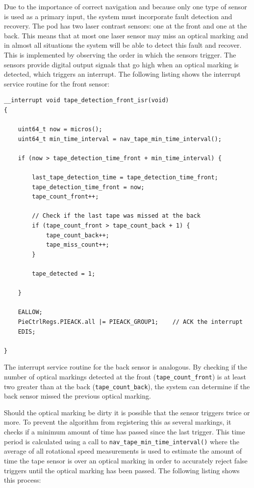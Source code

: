 Due to the importance of correct navigation and because only one type of sensor is used as a primary input, the system must incorporate fault detection and recovery. The pod has two laser contrast sensors: one at the front and one at the back. This means that at most one laser sensor may miss an optical marking and in almost all situations the system will be able to detect this fault and recover. This is implemented by observing the order in which the sensors trigger. The sensors provide digital output signals that go high when an optical marking is detected, which triggers an interrupt. The following listing shows the interrupt service routine for the front sensor:

\begin{verbatim}
__interrupt void tape_detection_front_isr(void)
{

    uint64_t now = micros();
    uint64_t min_time_interval = nav_tape_min_time_interval();

    if (now > tape_detection_time_front + min_time_interval) {

        last_tape_detection_time = tape_detection_time_front;
        tape_detection_time_front = now;
        tape_count_front++;

        // Check if the last tape was missed at the back
        if (tape_count_front > tape_count_back + 1) {
            tape_count_back++;
            tape_miss_count++;
        }

        tape_detected = 1;

    }

    EALLOW;
    PieCtrlRegs.PIEACK.all |= PIEACK_GROUP1;    // ACK the interrupt
    EDIS;

}
\end{verbatim}

The interrupt service routine for the back sensor is analogous. By checking if the number of optical markings detected at the front (\texttt{tape_count_front}) is at least two greater than at the back (\texttt{tape_count_back}), the system can determine if the back sensor missed the previous optical marking.

Should the optical marking be dirty it is possible that the sensor triggers twice or more. To prevent the algorithm from registering this as several markings, it checks if a minimum amount of time has passed since the last trigger. This time period is calculated using a call to \texttt{nav_tape_min_time_interval()} where the average of all rotational speed measurements is used to estimate the amount of time the tape sensor is over an optical marking in order to accurately reject false triggers until the optical marking has been passed. The following listing shows this process:

